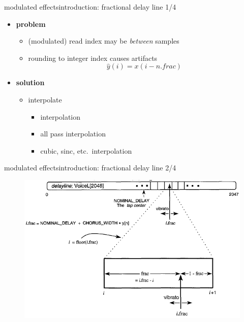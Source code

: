 		\begin{frame}{modulated effects}{introduction: fractional delay line 1/4}
			
			\begin{itemize}
				\item	\textbf{problem}
					\begin{itemize}
						\item	(modulated) read index may be \textit{between} samples
						\item	rounding to integer index causes artifacts
							\begin{equation*}
								\hat{y}(i) = x(i - n.frac)
							\end{equation*}
					\end{itemize}
				\pause
				\item	\textbf{solution}
					\begin{itemize}
						\item	interpolate
							\begin{itemize}
								\item	{} interpolation
								\item	all pass interpolation
								\item	cubic, sinc, etc.\ interpolation
							\end{itemize}
					\end{itemize}
			\end{itemize}
		\end{frame}

		\begin{frame}{modulated effects}{introduction: fractional delay line 2/4}
            \vspace{-3mm}
			\begin{figure}
				\centerline{\includegraphics[scale=.5]{graph/frac_delay_line}}
				\label{fig:frac_delay_line}
			\end{figure}
           \vspace{-2mm}
		\end{frame}

